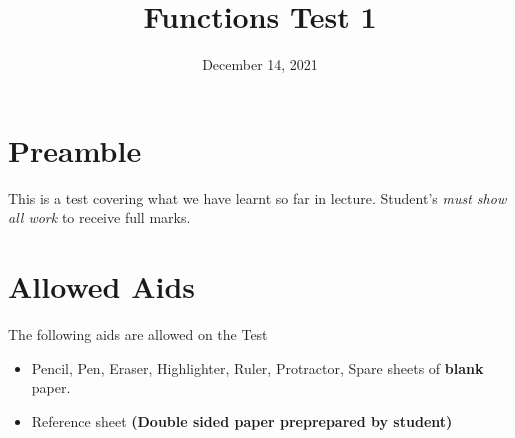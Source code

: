 \documentclass[12pt]{article} %
\title{Functions Test 1}
\date{December 14, 2021}
\begin{document}
    \renewcommand*{\coursecode}{MCR3U Quiz} %
    \renewcommand*{\assgnnumber}{1} %
    \renewcommand*{\submdate}{November, 2021} %
    \renewcommand*{\studentfname}{\textbf{Name:}} %
    \renewcommand*{\studentlname}{} %

    \renewcommand\qedsymbol{$\blacksquare$}
    \setfigpath
    \fancyhfoffset[L,O]{0pt} %




	\maketitle
	\section{Preamble}
	This is a test covering what we have learnt so far in lecture. Student's \emph{must show all work} to receive full marks.
	\section{Allowed Aids}
	The following aids are allowed on the Test
	\begin{itemize}
		\item Pencil, Pen, Eraser, Highlighter, Ruler, Protractor, Spare sheets of \textbf{blank} paper.
		\item Reference sheet \textbf{(Double sided paper preprepared by student)}
	\end{itemize}
\end{document}
